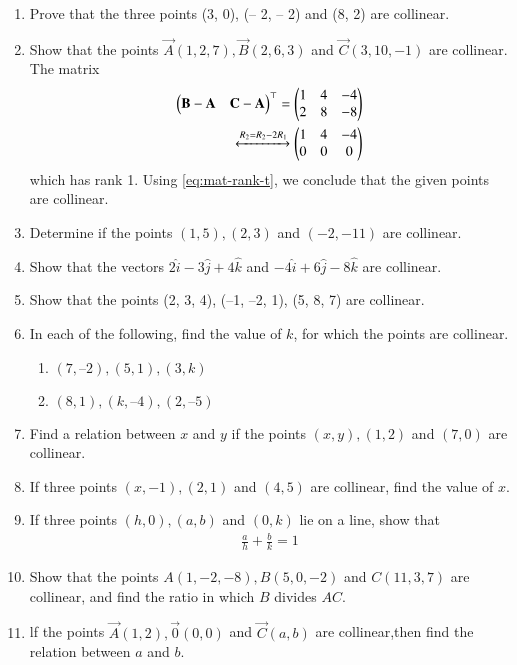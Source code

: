 \begin{enumerate}[label=\thesubsection.\arabic*,ref=\thesubsection.\theenumi]
\item 
Prove that the three points (3, 0), (– 2, – 2) and (8, 2) are collinear.
\label{chapters/11/10/2/20}
	\\
	\solution 

\item Show that the points $\vec{A}(1,2,7), \vec{B}(2,6,3)$ and $\vec{C}(3,10,-1)$ are collinear.
	\\
		\solution The matrix
\begin{align}
	\begin{pmatrix}\mathbf{B}-\mathbf{A}& \mathbf{C}-\mathbf{A}\end{pmatrix}^\top 
	= \begin{pmatrix}1 & 4 & -4 \\ 2 & 8 & -8\end{pmatrix}
	\\
	\xleftrightarrow[]{R_2 = R_2 - 2R_1}
	 \begin{pmatrix}1 & 4 & -4 \\ 0 & 0 & 0\end{pmatrix}
\end{align}
which has rank 1.  Using 
			\eqref{eq:mat-rank-t},
			 we conclude that the given points are collinear.
\item Determine if the points $(1,5),(2,3)$ and $(-2,-11)$ are collinear.
\item Show that the vectors $2\hat{i}-3\hat{j}+4\hat{k}$ and $-4\hat{i}+6\hat{j}-8\hat{k}$ are collinear.
\item Show that the points (2, 3, 4), (–1, –2, 1), (5, 8, 7) are collinear.
\item In each of the following, find the value of $k$, for which the points are collinear.
\begin{enumerate}
\item $(7, –2), (5, 1), (3, k)$
\item $(8, 1), (k, – 4), (2, –5)$
\end{enumerate}
		\label{10/7/3/2}
\item Find a relation between $x$ and $y$ if the points $(x, y), (1, 2)$  and  $(7, 0)$ are collinear.
\item If three points $(x, -1), (2, 1)$ and $(4, 5)$ are collinear, find the value of $x$.
\label{chapters/11/10/1/8}
\item If three points $(h, 0), (a, b)$ and $(0, k)$ lie on a line, 
show that 
\begin{align}
\frac{a}{h}+\frac{b}{k}=1
\end{align}
\label{chapters/11/10/1/13}
\item Show that the points $A (1, -2, -8), B (5, 0, -2)$ and $C (11, 3, 7)$ are collinear, and find the ratio in which $B$ divides $AC$.
\item lf the points $\vec{A}(1,2),\vec{0}(0,0)$ and $\vec{C}(a,b)$ are collinear,then find the relation between $a$ and $b$.

\end{enumerate}
